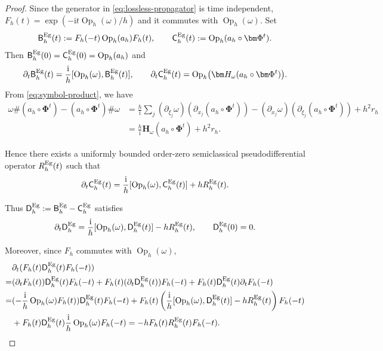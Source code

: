 \documentclass[11pt,reqno]{amsart}
\newcommand{\ii}{\mathrm{i}}
\newcommand{\Op}{\operatorname{Op}}
\numberwithin{equation}{section}
\begin{document}
\begin{proof}
Since the generator in \eqref{eq:lossless-propagator} is time independent, $F_h(t)=\exp(-\ii t\Op_h(\omega)/h)$ and it commutes with $\Op_h(\omega)$. Set
\begin{equation*}
    \mathsf B_h^{\rm Eg}(t):=F_h(-t)\Op_h(a_h)F_h(t), \qquad \mathsf C_h^{\rm Eg}(t):=\Op_h(a_h\circ\bm\Phi^t).
\end{equation*}
Then $\mathsf B_h^{\rm Eg}(0)=\mathsf C_h^{\rm Eg}(0)=\Op_h(a_h)$ and
\begin{equation*}
    \partial_t\mathsf B_h^{\rm Eg}(t)=\frac{\ii}{h}[\Op_h(\omega),\mathsf B_h^{\rm Eg}(t)], \qquad \partial_t\mathsf C_h^{\rm Eg}(t)=\Op_h\bigl(\bm H_\omega(a_h\circ\bm\Phi^t)\bigr).
\end{equation*}
From \eqref{eq:symbol-product}, we have
\begin{align*}
    \omega\#(a_h\circ\bm{\Phi}^t)-(a_h\circ\bm{\Phi}^t)\#\omega&=\frac{h}{\ii}\sum_j (\partial_{\xi_j}\omega)(\partial_{x_j}(a_h\circ\bm{\Phi}^t))-(\partial_{x_j}\omega)(\partial_{\xi_j}(a_h\circ\bm{\Phi}^t))+h^2r_h \\
    &= \frac{h}{\ii}\bm H_\omega(a_h\circ\bm{\Phi}^t)+h^2r_h.
\end{align*}

Hence there exists a uniformly bounded order-zero semiclassical pseudodifferential operator $R_h^{\rm Eg}(t)$ such that
\begin{equation*}
    \partial_t\mathsf C_h^{\rm Eg}(t)=\frac{\ii}{h}[\Op_h(\omega),\mathsf C_h^{\rm Eg}(t)]+hR_h^{\rm Eg}(t).
\end{equation*}

Thus $\mathsf D_h^{\rm Eg}:=\mathsf B_h^{\rm Eg}-\mathsf C_h^{\rm Eg}$ satisfies
\begin{equation*}
    \partial_t\mathsf D_h^{\rm Eg}=\frac{\ii}{h}[\Op_h(\omega),\mathsf D_h^{\rm Eg}(t)]-hR_h^{\rm Eg}(t), \qquad \mathsf D_h^{\rm Eg}(0)=0.
\end{equation*}

Moreover, since $F_h$ commutes with $\Op_h(\omega)$, 
\begin{align*}
    &\partial_t(F_h(t)\mathsf D_h^{\rm Eg}(t)F_h(-t)) \\ =& (\partial_tF_h(t))\mathsf D_h^{\rm Eg}(t)F_h(-t) + F_h(t)(\partial_t\mathsf D_h^{\rm Eg}(t))F_h(-t) + F_h(t)\mathsf D_h^{\rm Eg}(t)\partial_tF_h(-t) \\
    =& (-\frac{\ii}{h}\Op_h(\omega)F_h(t))\mathsf D_h^{\rm Eg}(t)F_h(-t) +F_h(t)\left(\frac{\ii}{h}[\Op_h(\omega), \mathsf D_h^{\rm Eg}(t)]-hR_h^{\rm Eg}(t)\right)F_h(-t) \\ &+ F_h(t)\mathsf D_h^{\rm Eg}(t)\frac{\ii}{h}\Op_h(\omega)F_h(-t) = -hF_h(t)R_h^{\rm Eg}(t)F_h(-t).
\end{align*}


\end{proof}
\end{document}
